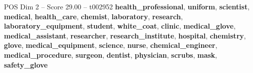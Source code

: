 \begin{textsample}{POS Dim 2 – Score 29.00 – t002952}  \label{ex:f2_pos_014}
\textbf{health\_professional}, \textbf{uniform}, \textbf{scientist}, \textbf{medical}, \textbf{health\_care}, \textbf{chemist}, \textbf{laboratory}, \textbf{research}, \textbf{laboratory\_equipment}, \textbf{student}, \textbf{white\_coat}, \textbf{clinic}, \textbf{medical\_glove}, \textbf{medical\_assistant}, \textbf{researcher}, \textbf{research\_institute}, \textbf{hospital}, \textbf{chemistry}, \textbf{glove}, \textbf{medical\_equipment}, \textbf{science}, \textbf{nurse}, \textbf{chemical\_engineer}, \textbf{medical\_procedure}, \textbf{surgeon}, \textbf{dentist}, \textbf{physician}, \textbf{scrubs}, \textbf{mask}, \textbf{safety\_glove}

\end{textsample}
